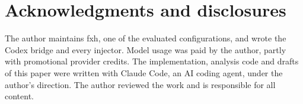 \section*{Acknowledgments and disclosures}

The author maintains fxh, one of the evaluated configurations, and wrote the Codex bridge and every injector.
Model usage was paid by the author, partly with promotional provider credits.
The implementation, analysis code and drafts of this paper were written with Claude Code, an AI coding agent, under the author's direction.
The author reviewed the work and is responsible for all content.
